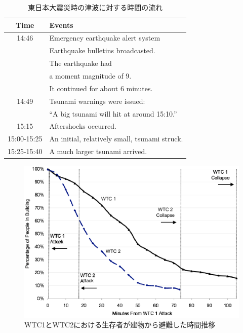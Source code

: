 \documentclass[a4j]{jarticle}
\begin{document}
\begin{table}[h]
\small
\centering
\caption{東日本大震災時の津波に対する時間の流れ}
\label{disaster-situation}
\begin{tabular}{|c||l|}\hline
Time
& Events \\ \hline
14:46 & Emergency earthquake alert system \\
      & Earthquake bulletins broadcasted.\\
      & The earthquake had \\
      & a moment magnitude of 9. \\
      & It continued for about 6 minutes.\\
14:49 & Tsunami warnings were issued:\\
      & ``A big tsunami will hit at around 15:10.''\\
15:15& Aftershocks occurred.\\
15:00-15:25& An initial, relatively small, tsunami struck.\\
15:25-15:40& A much larger tsunami arrived.\\ \hline
\end{tabular}
\end{table}

\begin{figure}[h]
\centering
\includegraphics[width=\linewidth]{fig/wtc-comparison.pdf}
\caption{WTC1とWTC2における生存者が建物から避難した時間推移\cite{NIST}}
\label{fig:wtc-comparison}
\end{figure}
\end{document}
